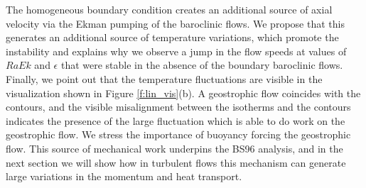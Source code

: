 The homogeneous boundary condition creates an additional source of axial velocity via the Ekman pumping of the baroclinic flows. We propose that this generates an additional source of temperature variations, which promote the instability and explains why we observe a jump in the flow speeds at values of $RaEk$ and $\epsilon$ that were stable in the absence of the boundary baroclinic flows.
Finally, we point out that the temperature fluctuations are visible in the visualization shown in Figure \ref{f:lin_vis}(b). 
A geostrophic flow coincides with the contours, and the visible misalignment between the isotherms and the contours indicates the presence of the large fluctuation which is able to do work on the geostrophic flow.
We stress the importance of buoyancy forcing the geostrophic flow. This source of mechanical work underpins the BS96 analysis, and in the next section we will show how in turbulent flows this mechanism can generate large variations in the momentum and heat transport.
%
%
%
%

